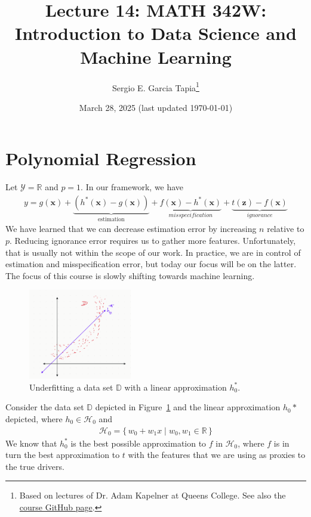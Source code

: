 \documentclass[12pt, a4paper]{article}
\title{Lecture 14: MATH 342W: Introduction to Data Science and Machine Learning}
\author{Sergio E. Garcia Tapia\thanks{Based on lectures of Dr. Adam Kapelner at Queens College.
See also the \href{https://github.com/kapelner/QC_MATH_342W_Spring_2025}{course GitHub page}.}}
\date{March 28, 2025 (last updated \today)}
\theoremstyle{definition}
\begin{document}
	\maketitle
	\section*{Polynomial Regression}
	Let $\mathcal{Y}=\mathbb{R}$ and $p=1$. In our framework, we have
	\begin{align*}
		y = g(\bm{x}) + 
		\underbrace{(h^*(\bm{x}) - g(\bm{x}))}_{{\text{estimation}}} + 
		\underbrace{f(\bm{x}) - h^*(\bm{x})}_{\textit{misspecification}} +
		\underbrace{t(\bm{z}) - f(\bm{x})}_{\textit{ignorance}}
	\end{align*}
	We have learned that we can decrease estimation error by increasing $n$ relative
	to $p$. Reducing ignorance error requires us to gather more features. Unfortunately,
	that is usually not within the scope of our work. In practice, we are in control
	of estimation and misspecification error, but today our focus will be on the latter.
	The focus of this course is slowly shifting towards machine learning.
	
	
	\begin{figure}
		\centering
		\includegraphics[width=0.4\textwidth]{underfit-with-linear-function}
		\caption{Underfitting a data set $\mathbb{D}$ with a linear approximation
		$h_0^*$.}
		\label{fig:underfit-D-with-linear}
	\end{figure}
	
	Consider the data set $\mathbb{D}$ depicted in Figure~\ref{fig:underfit-D-with-linear}
	and the linear approximation $h_0*$ depicted, where $h_0\in \mathcal{H}_0$ and
	\begin{align*}
		\mathcal{H}_0 =\{\, w_0+w_1x \mid w_0,w_1\in \mathbb{R}\,\} 
	\end{align*}
	We know that $h_0^*$ is the best possible approximation to $f$ in $\mathcal{H}_0$, where
	$f$ is in turn the best approximation to $t$ with the features that we are using as proxies
	to the true drivers.
	
\end{document}
